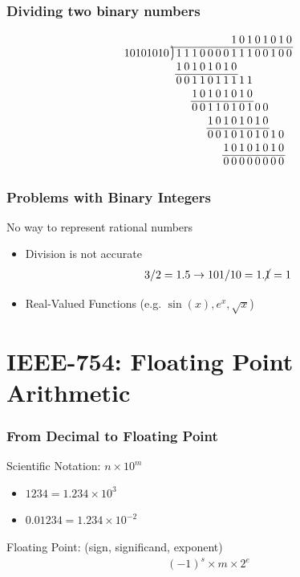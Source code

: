 \documentclass[10pt]{beamer}
\newcommand{\longdiv}{\smash{\mkern-0.43mu\vstretch{1.31}{\hstretch{.7}{)}}\mkern-5.2mu\vstretch{1.31}{\hstretch{.7}{)}}}}
\begin{document}
\begin{frame}
    \frametitle{Dividing two binary numbers}
    \begin{align*}
        \arraycolsep=1pt
        \begin{array}{ccccccccccccccccc}
            &          &&&&&&&& 1 &0 &1& 0 & 1&0&1&0  \\
    \cline{2-17}
    10101010&\longdiv  & 1 & 1 & 1 & 0 & 0 & 0 & 0 & 1 & 1 & 1 & 0 & 0 & 1 & 0 & 0 \\
            &          & 1 & 0 & 1 & 0 & 1 & 0 & 1 & 0 &      \\
    \cline{3-10}
            &          & 0 & 0 & 1 & 1 & 0 & 1 & 1 & 1 & 1 & 1  \\
            &          &   &   & 1 & 0 & 1 & 0 & 1 & 0 & 1 & 0  \\
    \cline{5-12}
            &          &   &   & 0 & 0 & 1 & 1 & 0 & 1 & 0 & 1 & 0 & 0  \\
            &          &   &   &   &   & 1 & 0 & 1 & 0 & 1 & 0 & 1 & 0  \\
    \cline{7-14}
            &          &   &   &   &   & 0 & 0 & 1 & 0 & 1 & 0 & 1 & 0 & 1 & 0   \\
            &          &   &   &   &   &   &   & 1 & 0 & 1 & 0 & 1 & 0 & 1 & 0   \\
    \cline{9-16}
            &          &   &   &   &   &   &   & 0 & 0 & 0 & 0 & 0 & 0 & 0 & 0
        \end{array}
    \end{align*}
\end{frame}

\begin{frame}
    \frametitle{Problems with Binary Integers}
    No way to represent rational numbers \pause
    \begin{itemize}
        \item Division is not accurate
        \begin{align*}
            3 / 2 = 1.5 \to 101 / 10 = 1.\cancel{1} = 1
        \end{align*} \pause
        \item Real-Valued Functions (e.g. $\sin(x), e^{x}, \sqrt{x}$)
    \end{itemize}
\end{frame}
 
\section{IEEE-754: Floating Point Arithmetic}
\begin{frame}
    \frametitle{From Decimal to Floating Point}
    Scientific Notation: $n \times 10^m$
    \begin{itemize}
        \item $1234 = 1.234 \times 10^3$
        \item $0.01234 = 1.234 \times 10^{-2}$
    \end{itemize} \pause
    Floating Point: (sign, significand, exponent)
    \begin{align*}
        (-1)^s \times m \times 2^{e}
    \end{align*}
\end{frame}
\end{document}
